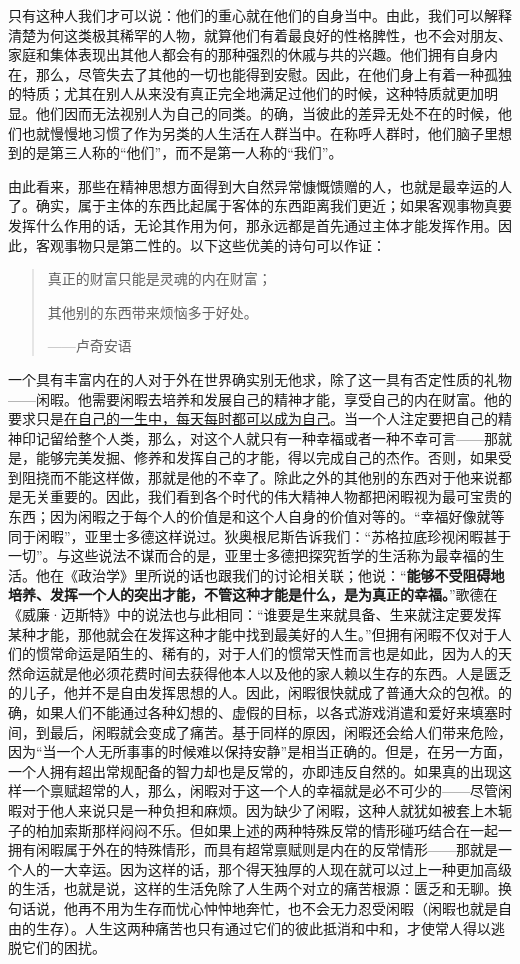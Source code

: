 \documentclass[12pt,oneside]{book}
\begin{document}
只有这种人我们才可以说：他们的重心就在他们的自身当中。由此，我们可以解释清楚为何这类极其稀罕的人物，就算他们有着最良好的性格脾性，也不会对朋友、家庭和集体表现出其他人都会有的那种强烈的休戚与共的兴趣。他们拥有自身内在，那么，尽管失去了其他的一切也能得到安慰。因此，在他们身上有着一种孤独的特质；尤其在别人从来没有真正完全地满足过他们的时候，这种特质就更加明显。他们因而无法视别人为自己的同类。的确，当彼此的差异无处不在的时候，他们也就慢慢地习惯了作为另类的人生活在人群当中。在称呼人群时，他们脑子里想到的是第三人称的“他们”，而不是第一人称的“我们”。 


由此看来，那些在精神思想方面得到大自然异常慷慨馈赠的人，也就是最幸运的人了。确实，属于主体的东西比起属于客体的东西距离我们更近；如果客观事物真要发挥什么作用的话，无论其作用为何，那永远都是首先通过主体才能发挥作用。因此，客观事物只是第二性的。以下这些优美的诗句可以作证： 

 
\begin{quotation}
真正的财富只能是灵魂的内在财富； 

其他别的东西带来烦恼多于好处。 

——卢奇安语 
\end{quotation}


一个具有丰富内在的人对于外在世界确实别无他求，除了这一具有否定性质的礼物——闲暇。他需要闲暇去培养和发展自己的精神才能，享受自己的内在财富。他的要求只是\uline{在自己的一生中，每天每时都可以成为自己}。当一个人注定要把自己的精神印记留给整个人类，那么，对这个人就只有一种幸福或者一种不幸可言——那就是，能够完美发掘、修养和发挥自己的才能，得以完成自己的杰作。否则，如果受到阻挠而不能这样做，那就是他的不幸了。除此之外的其他别的东西对于他来说都是无关重要的。因此，我们看到各个时代的伟大精神人物都把闲暇视为最可宝贵的东西；因为闲暇之于每个人的价值是和这个人自身的价值对等的。“幸福好像就等同于闲暇”，亚里士多德这样说过。狄奥根尼斯告诉我们：“苏格拉底珍视闲暇甚于一切”。与这些说法不谋而合的是，亚里士多德把探究哲学的生活称为最幸福的生活。他在《政治学》里所说的话也跟我们的讨论相关联；他说：“\textbf{能够不受阻碍地培养、发挥一个人的突出才能，不管这种才能是什么，是为真正的幸福。}”歌德在《威廉·迈斯特》中的说法也与此相同：“谁要是生来就具备、生来就注定要发挥某种才能，那他就会在发挥这种才能中找到最美好的人生。”但拥有闲暇不仅对于人们的惯常命运是陌生的、稀有的，对于人们的惯常天性而言也是如此，因为人的天然命运就是他必须花费时间去获得他本人以及他的家人赖以生存的东西。人是匮乏的儿子，他并不是自由发挥思想的人。因此，闲暇很快就成了普通大众的包袱。的确，如果人们不能通过各种幻想的、虚假的目标，以各式游戏消遣和爱好来填塞时间，到最后，闲暇就会变成了痛苦。基于同样的原因，闲暇还会给人们带来危险，因为“当一个人无所事事的时候难以保持安静”是相当正确的。但是，在另一方面，一个人拥有超出常规配备的智力却也是反常的，亦即违反自然的。如果真的出现这样一个禀赋超常的人，那么，闲暇对于这一个人的幸福就是必不可少的——尽管闲暇对于他人来说只是一种负担和麻烦。因为缺少了闲暇，这种人就犹如被套上木轭子的柏加索斯那样闷闷不乐。但如果上述的两种特殊反常的情形碰巧结合在一起一拥有闲暇属于外在的特殊情形，而具有超常禀赋则是内在的反常情形——那就是一个人的一大幸运。因为这样的话，那个得天独厚的人现在就可以过上一种更加高级的生活，也就是说，这样的生活免除了人生两个对立的痛苦根源：匮乏和无聊。换句话说，他再不用为生存而忧心忡忡地奔忙，也不会无力忍受闲暇（闲暇也就是自由的生存）。人生这两种痛苦也只有通过它们的彼此抵消和中和，才使常人得以逃脱它们的困扰。 
\end{document}
